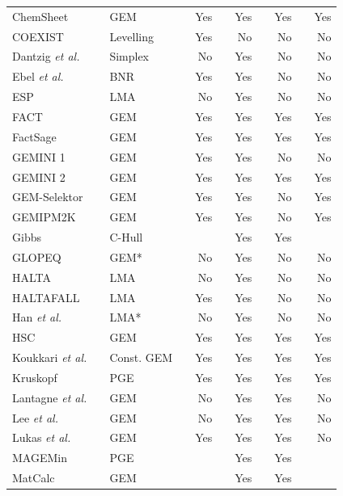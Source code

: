 {\begin{longtable}{@{}lclcrcrcrcr@{}}
		ChemSheet \cite{Koukkari:2005aa} && GEM && Yes && Yes && Yes && Yes\\
		COEXIST \cite{Ahafat:1992aa} && Levelling && Yes && No && No && No\\
		Dantzig \textit{et al.} \cite{Dantzig:1958aa}&& Simplex && No && Yes && No && No\\
		Ebel \textit{et al.} \cite{Ebel:2000aa} && BNR && Yes && Yes && No && No\\
		ESP \cite{Rafal:2003aa} && LMA && No && Yes && No && No\\
		FACT \cite{Thompson83} && GEM && Yes && Yes && Yes && Yes\\
		FactSage \cite{Bale83} && GEM && Yes && Yes && Yes && Yes\\
		GEMINI 1 \cite{Cheynet09} && GEM && Yes && Yes && No && No\\
		GEMINI 2 \cite{Cheynet09} && GEM && Yes && Yes && Yes && Yes\\
		GEM-Selektor \cite{Karpov:aa} && GEM && Yes && Yes && No && Yes\\
		GEMIPM2K \cite{Karpov:aa} && GEM && Yes && Yes && No && Yes\\
		Gibbs \cite{COOL2010393} && C-Hull && {} && Yes && Yes && {}\\
		GLOPEQ \cite{MCDONALD19971} && GEM* && No && Yes && No && No\\
		HALTA \cite{Sillen:1962aa} && LMA && No && Yes && No && No\\
		HALTAFALL \cite{INGRI19671261} && LMA && Yes && Yes && No && No\\
		Han \textit{et al.} \cite{HAN1998897} && LMA* && No && Yes && No && No\\
		HSC \cite{HSCSoftware:aa} && GEM && Yes && Yes && Yes && Yes\\
		Koukkari \textit{et al.} \cite{KOUKKARI200618} && Const. GEM && Yes && Yes && Yes && Yes\\
		Kruskopf \cite{Kruskopf:2018aa} && PGE && Yes && Yes && Yes && Yes\\
		Lantagne \textit{et al.} \cite{LANTAGNE1988589} && {GEM} && No && Yes && Yes && No\\
		Lee \textit{et al.} \cite{PENGLEE19991183} && {GEM} && No && Yes && Yes && No\\
		Lukas \textit{et al.} \cite{Lukas77} && {GEM} && Yes && Yes && Yes && No\\
		MAGEMin \cite{Riel:2022aa} && {PGE} &&  && Yes && Yes && \\
		MatCalc \cite{Kozeschnik:2001aa} && {GEM} &&  && Yes && Yes && \\

\end{longtable}}
